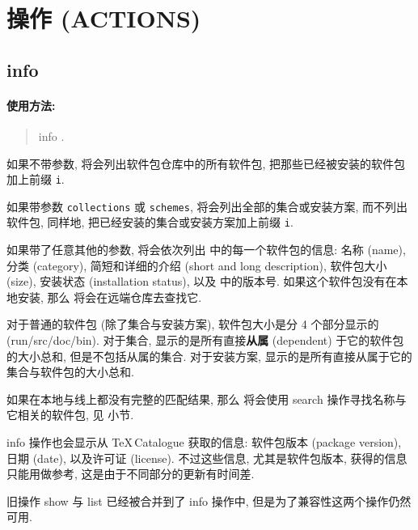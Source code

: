 \section[操作]{操作 (ACTIONS)}

\subsection{\mdseries\ac{info}}\label{subsec:info}

\paragraph{使用方法:}


\begin{quote}
    \tlmgr{} \ac{info} .
\end{quote}

如果不带参数, 将会列出软件包仓库中的所有软件包, 把那些已经被安装的软件包加上前缀 \texttt{i}.

如果带参数 \texttt{collections} 或 \texttt{schemes}, 将会列出全部的集合或安装方案, 而不列出软件包, 同样地, 把已经安装的集合或安装方案加上前缀 \texttt{i}. 

如果带了任意其他的参数, 将会依次列出  中的每一个软件包的信息: 名称 (name), 分类 (category), 简短和详细的介绍 (short and long description), 软件包大小 (size), 安装状态 (installation status), 以及 \tl 中的版本号. 如果这个软件包没有在本地安装, 那么 \tlmgr 将会在远端仓库去查找它. 

对于普通的软件包 (除了集合与安装方案), 软件包大小是分 4 个部分显示的 (run/src/doc/bin). 对于集合, 显示的是所有直接\textbf{从属} (dependent) 于它的软件包的大小总和, 但是不包括从属的集合. 对于安装方案, 显示的是所有直接从属于它的集合与软件包的大小总和. 

如果在本地与线上都没有完整的匹配结果, 那么 \tlmgr 将会使用 \ac{search} 操作寻找名称与它相关的软件包, 见  小节. 

\ac{info} 操作也会显示从 \TeX\,Catalogue 获取的信息: 软件包版本 (package version), 日期 (date), 以及许可证 (license). 不过这些信息, 尤其是软件包版本, 获得的信息只能用做参考, 这是由于不同部分的更新有时间差. 

旧操作 \ac{show} 与 \ac{list} 已经被合并到了 \ac{info} 操作中, 但是为了兼容性这两个操作仍然可用. 

